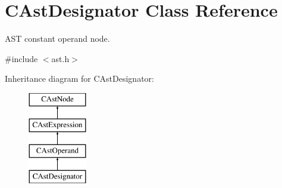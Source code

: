 \hypertarget{classCAstDesignator}{\section{C\-Ast\-Designator Class Reference}
\label{classCAstDesignator}
}


A\-S\-T constant operand node.  




{\ttfamily \#include $<$ast.\-h$>$}

Inheritance diagram for C\-Ast\-Designator\-:\begin{figure}[H]
\begin{center}
\leavevmode
\includegraphics[height=4.000000cm]{classCAstDesignator}
\end{center}
\end{figure}
